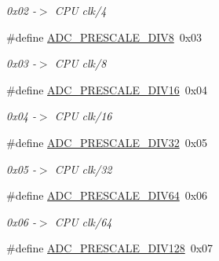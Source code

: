 \begin{CompactItemize}
\begin{CompactList}\small\item\em 0x02 -$>$ CPU clk/4 \item\end{CompactList}\item 
\hypertarget{group__a2d_gfc060b8cc9bc407394efc98930dd9b06}{
\#define \hyperlink{group__a2d_gfc060b8cc9bc407394efc98930dd9b06}{ADC\_\-PRESCALE\_\-DIV8}~0x03}
\label{group__a2d_gfc060b8cc9bc407394efc98930dd9b06}

\begin{CompactList}\small\item\em 0x03 -$>$ CPU clk/8 \item\end{CompactList}\item 
\hypertarget{group__a2d_g588a7712025228700d3331fbb60b4aea}{
\#define \hyperlink{group__a2d_g588a7712025228700d3331fbb60b4aea}{ADC\_\-PRESCALE\_\-DIV16}~0x04}
\label{group__a2d_g588a7712025228700d3331fbb60b4aea}

\begin{CompactList}\small\item\em 0x04 -$>$ CPU clk/16 \item\end{CompactList}\item 
\hypertarget{group__a2d_gb3fd1406c04d98209cc1c17c77b8619a}{
\#define \hyperlink{group__a2d_gb3fd1406c04d98209cc1c17c77b8619a}{ADC\_\-PRESCALE\_\-DIV32}~0x05}
\label{group__a2d_gb3fd1406c04d98209cc1c17c77b8619a}

\begin{CompactList}\small\item\em 0x05 -$>$ CPU clk/32 \item\end{CompactList}\item 
\hypertarget{group__a2d_g5ad4cc849977e40d0a2a98c304a4be7b}{
\#define \hyperlink{group__a2d_g5ad4cc849977e40d0a2a98c304a4be7b}{ADC\_\-PRESCALE\_\-DIV64}~0x06}
\label{group__a2d_g5ad4cc849977e40d0a2a98c304a4be7b}

\begin{CompactList}\small\item\em 0x06 -$>$ CPU clk/64 \item\end{CompactList}\item 
\hypertarget{group__a2d_g56e8398ed5a4236f10dadb6d7d5e1a3b}{
\#define \hyperlink{group__a2d_g56e8398ed5a4236f10dadb6d7d5e1a3b}{ADC\_\-PRESCALE\_\-DIV128}~0x07}
\label{group__a2d_g56e8398ed5a4236f10dadb6d7d5e1a3b}


\end{CompactItemize}
